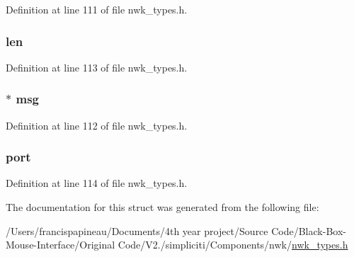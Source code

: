 \-Definition at line 111 of file nwk\-\_\-types.\-h.

\hypertarget{structioctlRawSend__t_a5723e60ffd628510c699eddbce90be23}{
\subsubsection[{len}]{ {\bf len}}}\label{structioctlRawSend__t_a5723e60ffd628510c699eddbce90be23}


\-Definition at line 113 of file nwk\-\_\-types.\-h.

\hypertarget{structioctlRawSend__t_a8dd37bf01473e324d7c15a19fd211de9}{
\subsubsection[{msg}]{$\ast$ {\bf msg}}}\label{structioctlRawSend__t_a8dd37bf01473e324d7c15a19fd211de9}


\-Definition at line 112 of file nwk\-\_\-types.\-h.

\hypertarget{structioctlRawSend__t_a2fa54f9024782843172506fadbee2ac8}{
\subsubsection[{port}]{ {\bf port}}}\label{structioctlRawSend__t_a2fa54f9024782843172506fadbee2ac8}


\-Definition at line 114 of file nwk\-\_\-types.\-h.



\-The documentation for this struct was generated from the following file\-:\begin{DoxyCompactItemize}
\item 
/\-Users/francispapineau/\-Documents/4th year project/\-Source Code/\-Black-\/\-Box-\/\-Mouse-\/\-Interface/\-Original Code/\-V2./simpliciti/\-Components/nwk/\hyperlink{nwk__types_8h}{nwk\-\_\-types.\-h}\end{DoxyCompactItemize}
